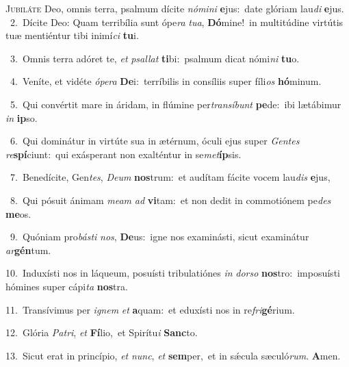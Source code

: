 \lettrine{\initial\textcolor{\initialcolor}{J}}{ubiláte} Deo, omnis terra, psalmum dícite \textit{nó}\-\textit{mi}\textit{ni} \textbf{e}\-jus:~\star date glóriam lau\textit{di} \textbf{e}\-jus.\\
{\numbfont\textcolor{\numbcolor}{~2.}}~Dícite Deo: Quam terribília sunt ópe\textit{ra} \textit{tu}\-\textit{a}, \textbf{Dó}\-mine!~\star in multitúdine virtútis tuæ mentiéntur tibi inimí\textit{ci} \textbf{tu}\-i.\par
{\numbfont\textcolor{\numbcolor}{~3.}}~Omnis terra adóret te, \textit{et} \textit{psal}\-\textit{lat} \textbf{ti}\-bi:~\star psalmum dicat nómi\textit{ni} \textbf{tu}\-o.\par
{\numbfont\textcolor{\numbcolor}{~4.}}~Veníte, et vidéte \textit{ó}\-\textit{pe}\textit{ra} \textbf{De}\-i:~\star terríbilis in consíliis super fíli\textit{os} \textbf{hó}\-minum.\par
{\numbfont\textcolor{\numbcolor}{~5.}}~Qui convértit mare in áridam, in flúmine per\-\textit{trans}\-\textit{í}\textit{bunt} \textbf{pe}\-de:~\star ibi lætábimur \textit{in} \textbf{ip}\-so.\par
{\numbfont\textcolor{\numbcolor}{~6.}}~Qui dominátur in virtúte sua in ætérnum, óculi ejus super \textit{Gen}\-\textit{tes} \textit{re}\-\textbf{spí}ciunt:~\star qui exásperant non exalténtur in se\-\textit{met}\-\textbf{íp}sis.\par
{\numbfont\textcolor{\numbcolor}{~7.}}~Benedícite, Gen\-\textit{tes}\-, \textit{De}\-\textit{um} \textbf{nos}\-trum:~\star et audítam fácite vocem lau\textit{dis} \textbf{e}\-jus,\par
{\numbfont\textcolor{\numbcolor}{~8.}}~Qui pósuit ánimam \textit{me}\-\textit{am} \textit{ad} \textbf{vi}\-tam:~\star et non dedit in commotiónem pe\textit{des} \textbf{me}\-os.\par
{\numbfont\textcolor{\numbcolor}{~9.}}~Quóniam pro\-\textit{bás}\-\textit{ti} \textit{nos}\-, \textbf{De}\-us:~\star igne nos examinásti, sicut examinátur \textit{ar}\-\textbf{gén}tum.\par
{\numbfont\textcolor{\numbcolor}{10.}}~Induxísti nos in láqueum, posuísti tribulatiónes \textit{in} \textit{dor}\-\textit{so} \textbf{nos}\-tro:~\star imposuísti hómines super cápi\textit{ta} \textbf{nos}\-tra.\par
{\numbfont\textcolor{\numbcolor}{11.}}~Transívimus per \textit{i}\-\textit{gnem} \textit{et} \textbf{a}\-quam:~\star et eduxísti nos in re\-\textit{fri}\-\textbf{gé}rium.\par
{\numbfont\textcolor{\numbcolor}{12.}}~Glória \textit{Pa}\-\textit{tri}, \textit{et} \textbf{Fí}\-lio,~\star et Spirítu\textit{i} \textbf{Sanc}\-to.\par
{\numbfont\textcolor{\numbcolor}{13.}}~Sicut erat in princípio, \textit{et} \textit{nunc}\-, \textit{et} \textbf{sem}\-per,~\star et in sǽcula sæculó\-\textit{rum}\-. \textbf{A}\-men.\par
